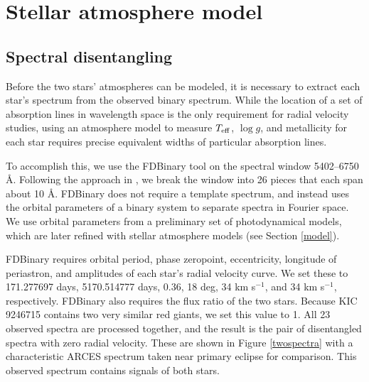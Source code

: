 \section{Stellar atmosphere model}\label{atm}

\subsection{Spectral disentangling}\label{disentangle}
Before the two stars' atmospheres can be modeled, it is necessary to extract each star's spectrum from the observed binary spectrum. While the location of a set of absorption lines in wavelength space is the only requirement for radial velocity studies, using an atmosphere model to measure $T_{\rm{eff}}$, $\log g$, and metallicity for each star requires precise equivalent widths of particular absorption lines.

To accomplish this, we use the FDBinary tool \citep{ili04} on the spectral window 5402--6750 \AA. Following the approach in \citet{bec14}, we break the window into 26 pieces that each span about 10 \AA. FDBinary does not require a template spectrum, and instead uses the orbital parameters of a binary system to separate spectra in Fourier space. We use orbital parameters from a preliminary set of photodynamical models, which are later refined with stellar atmosphere models (see Section \ref{model}).

FDBinary requires orbital period, phase zeropoint, eccentricity, longitude of periastron, and amplitudes of each star's radial velocity curve. We set these to 171.277697 days, 5170.514777 days, 0.36, 18 deg, 34 km s$^{-1}$, and 34 km s$^{-1}$, respectively. FDBinary also requires the flux ratio of the two stars. Because KIC 9246715 contains two very similar red giants, we set this value to 1. All 23 observed spectra are processed together, and the result is the pair of disentangled spectra with zero radial velocity. These are shown in Figure \ref{twospectra} with a characteristic ARCES spectrum taken near primary eclipse for comparison. This observed spectrum contains signals of both stars.

